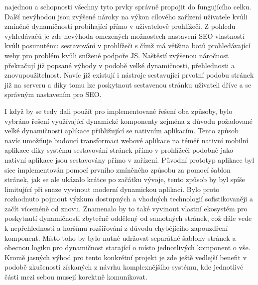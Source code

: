 \begin{itemize}
\begin{itemize}
	najednou a schopnosti všechny tyto prvky správně propojit do fungujícího celku.
	Další nevýhodou jsou zvýšené nároky na výkon cílového zařízení uživatele kvůli zmíněné dynamičnosti probíhající přímo
	v uživatelově prohlížeči.
	Z pohledu vyhledávačů je zde nevýhoda omezených možnostech nastavení \ac{SEO} vlastností kvůli posunutému sestavování
	v prohlížeči s čímž má většina botů prohledávající weby pro problém kvůli snížené podpoře \ac{JS}.
	Naštěstí zvýšenou náročnost překračují již popsané výhody v podobě velké dynamičnosti, přehlednosti a znovupoužitelnost.
	Navíc již existují i nástroje sestavující prvotní podobu stránek již na serveru a díky tomu lze poskytnout sestavenou
	stránku uživateli dříve a se správným nastavením pro \ac{SEO}.

	I když by se tedy dali použít pro implementované řešení oba způsoby, bylo vybráno řešení využívající dynamické komponenty
	zejména z důvodu požadované velké dynamičnosti aplikace přibližující se nativním aplikacím.
	Tento způsob navíc umožňuje budoucí transformaci webové aplikace na téměř nativní mobilní aplikace díky systému
	sestavování stránek přímo v prohlížeči podobně jako nativní aplikace jsou sestavovány přímo v zařízení.
	Původní prototyp aplikace byl sice implementován pomocí prvního zmíněného způsobu za pomocí šablon stránek, jak se
	ale ukázalo krátce po začátku vývoje, tento způsob by byl spíše limitující při snaze vyvinout moderní dynamickou aplikaci.
	Bylo proto rozhodnuto pojmout výzkum dostupných a vhodných technologií sofistikovaněji a začít víceméně od znovu. %
	Znamenalo by to také vyvinout vlastní ekosystém pro poskytnutí dynamičnosti zbytečně oddělený od samotných stránek,
	což dále vede k nepřehlednosti a horšímu rozšiřování z důvodu chybějícího zapouzdření komponent.
	Místo toho by bylo nutné udržovat separátně šablony stránek a obecnou logiku pro dynamičnost starající o místo
	jednotlivých komponent o vše.
	Kromě jasných výhod pro tento konkrétní projekt je zde ještě vedlejší benefit v podobě zkušeností získaných
	z návrhu komplexnějšího systému, kde jednotlivé části mezi sebou musejí korektně komunikovat.



\end{itemize}
\end{itemize}

